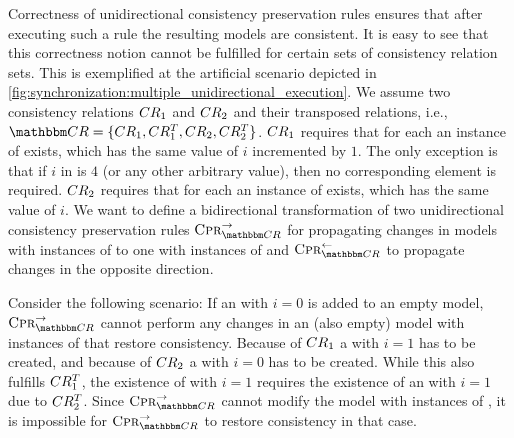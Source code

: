 Correctness of unidirectional consistency preservation rules ensures that after executing such a rule the resulting models are consistent.
It is easy to see that this correctness notion cannot be fulfilled for certain sets of consistency relation sets.
This is exemplified at the artificial scenario depicted in \autoref{fig:synchronization:multiple_unidirectional_execution}.
We assume two consistency relations $CR_{1}$ and $CR_{2}$ and their transposed relations, i.e., $\consistencyrelationset{CR} = \setted{\consistencyrelation{CR}{1}, \consistencyrelation{CR}{1}^T, \consistencyrelation{CR}{2}, \consistencyrelation{CR}{2}^T}$.
$CR_{1}$ requires that for each  an instance of  exists, which has the same value of $i$ incremented by $1$.
The only exception is that if $i$ in  is $4$ (or any other arbitrary value), then no corresponding element  is required.
$CR_{2}$ requires that for each  an instance of  exists, which has the same value of $i$.
We want to define a bidirectional transformation of two unidirectional consistency preservation rules $\consistencypreservationrule{\consistencyrelationset{CR}}^{\rightarrow}$ for propagating changes in models with instances of  to one with instances of  and $\consistencypreservationrule{\consistencyrelationset{CR}}^{\leftarrow}$ to propagate changes in the opposite direction. 

Consider the following scenario: If an  with $i = 0$ is added to an empty model, $\consistencypreservationrule{\consistencyrelationset{CR}}^{\rightarrow}$ cannot perform any changes in an (also empty) model with instances of  that restore consistency.
Because of $CR_{1}$ a  with $i = 1$ has to be created, and because of $CR_{2}$ a  with $i = 0$ has to be created.
While this also fulfills $CR_{1}^T$, the existence of  with $i = 1$ requires the existence of an  with $i = 1$ due to $CR_{2}^T$.
Since $\consistencypreservationrule{\consistencyrelationset{CR}}^{\rightarrow}$ cannot modify the model with instances of , it is impossible for $\consistencypreservationrule{\consistencyrelationset{CR}}^{\rightarrow}$ to restore consistency in that case.

